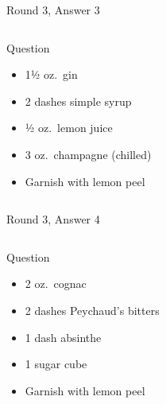 \documentclass[11pt]{beamer}
\begin{document}
\begin{frame}[t]{Round 3, Answer 3}
\begin{columns}[T,totalwidth=\linewidth]
\begin{column}{0.32\linewidth}
\begin{block}{Question}
\begin{itemize}
\item 1½ oz.\ gin
\item 2 dashes simple syrup
\item ½ oz.\ lemon juice
\item 3 oz.\ champagne (chilled)
\item Garnish with lemon peel
\end{itemize}
\end{block}
\end{column}
\begin{column}{0.65\linewidth}
    \end{center}
}
\end{column}
\end{columns}
\end{frame}
\begin{frame}[t]{Round 3, Answer 4}
\begin{columns}[T,totalwidth=\linewidth]
\begin{column}{0.32\linewidth}
\begin{block}{Question}
\begin{itemize}
\item 2 oz.\ cognac
\item 2 dashes Peychaud's bitters
\item 1 dash absinthe
\item 1 sugar cube
\item Garnish with lemon peel
\end{itemize}
\end{block}
\end{column}
\begin{column}{0.65\linewidth}
    \end{center}
}
\end{column}
\end{columns}
\end{frame}
\end{document}
